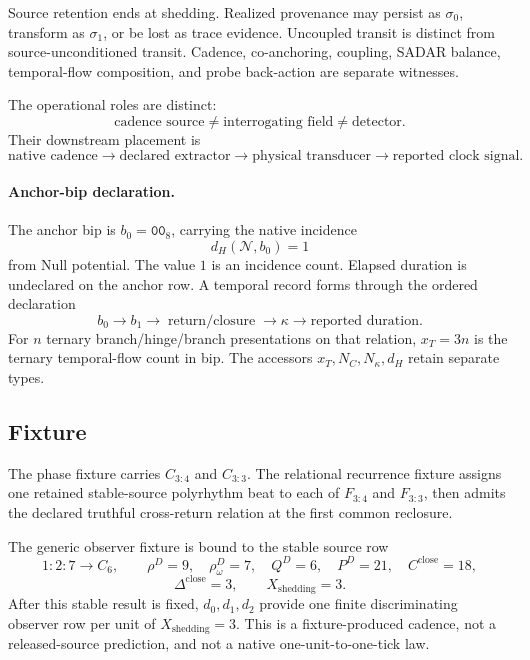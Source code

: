 Source retention ends at shedding. Realized provenance may persist as \(\sigma_0\), transform as \(\sigma_1\), or be lost as trace evidence. Uncoupled transit is distinct from source-unconditioned transit. Cadence, co-anchoring, coupling, SADAR balance, temporal-flow composition, and probe back-action are separate witnesses.

The operational roles are distinct:
\[
\text{cadence source}
\ne
\text{interrogating field}
\ne
\text{detector}.
\]
Their downstream placement is
\[
\text{native cadence}
\longrightarrow
\text{declared extractor}
\longrightarrow
\text{physical transducer}
\longrightarrow
\text{reported clock signal}.
\]

\paragraph{Anchor-bip declaration.}
The anchor bip is \(b_0=\mathtt{00}_8\), carrying the native incidence
\[
d_H(\mathcal N,b_0)=1
\]
from Null potential. The value \(1\) is an incidence count. Elapsed
duration is undeclared on the anchor row. A temporal record forms through
the ordered declaration
\[
b_0
\longrightarrow
b_1
\longrightarrow
\operatorname{return/closure}
\longrightarrow
\kappa
\longrightarrow
\text{reported duration}.
\]
For \(n\) ternary branch/hinge/branch presentations on that relation,
\(x_T=3n\) is the ternary temporal-flow count in bip. The accessors
\(x_T,N_C,N_\kappa,d_H\) retain separate types.

\subsection{Fixture}\label{manual:phase-temporal:fixture}
The phase fixture carries \(C_{3:4}\) and \(C_{3:3}\). The relational recurrence fixture assigns one retained stable-source polyrhythm beat to each of \(F_{3:4}\) and \(F_{3:3}\), then admits the declared truthful cross-return relation at the first common reclosure.

The generic observer fixture is bound to the stable source row
\[
1{:}2{:}7\longrightarrow C_6,
\qquad
\rho^D=9,
\quad
\rho^D_{\omega}=7,
\quad
Q^D=6,
\quad
P^D=21,
\quad
C^{\mathrm{close}}=18,
\]
\[
\Delta^{\mathrm{close}}=3,
\qquad
X_{\mathrm{shedding}}=3.
\]
After this stable result is fixed, \(d_0,d_1,d_2\) provide one finite discriminating observer row per unit of \(X_{\mathrm{shedding}}=3\). This is a fixture-produced cadence, not a released-source prediction, and not a native one-unit-to-one-tick law.

